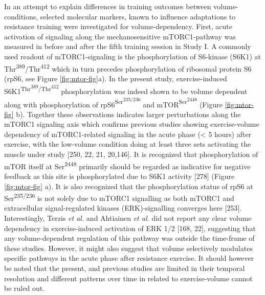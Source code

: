 \documentclass[twoside,10pt]{gihclass} %
\begin{document}
In an attempt to explain differences in training outcomes between volume-conditions, selected molecular markers, known to influence adaptations to resistance training were investigated for volume-dependency.
First, acute activation of signaling along the mechanosensitive mTORC1-pathway was measured in before and after the fifth training session in Study I.
A commonly used readout of mTORC1-signaling is the phosphorylation of S6-kinase (S6K1) at Thr\textsuperscript{389}/Thr\textsuperscript{412} which in turn precedes phosphorylation of ribosomal protein S6 (rpS6, see Figure \ref{fig:mtor-fig}a).
In the present study, exercise-induced S6K1\textsuperscript{Thr\textsuperscript{389}/Thr\textsuperscript{412}} phosphorylation was indeed shown to be volume dependent along with phosphorylation of rpS6\textsuperscript{Ser\textsuperscript{235/236}} and mTOR\textsuperscript{Ser\textsuperscript{2448}} (Figure \ref{fig:mtor-fig} b).
Together these observations indicates larger perturbations along the mTORC1 signaling axis which confirms previous studies showing exercise-volume dependency of mTORC1-related signaling in the acute phase (\textless{} 5 hours) after exercise, with the low-volume condition doing at least three sets activating the muscle under study
{[}250, 22, 21, 20,146{]}.
It is recognized that phosphorylation of mTOR itself at Ser\textsuperscript{2448} primarily should be regarded as indicative for negative feedback as this site is phosphorylated due to S6K1 activity
{[}278{]} (Figure \ref{fig:mtor-fig} a).
It is also recognized that the phosphorylation status of rpS6 at Ser\textsuperscript{235/236} is not solely due to mTORC1 signalling as both mTORC1 and extracellular signal-regulated kinases (ERK)-signalling converges here
{[}253{]}.
Interestingly, Terzis \emph{et al.} and Ahtiainen \emph{et al.} did not report any clear volume dependency in exercise-induced activation of ERK 1/2
{[}168, 22{]},
suggesting that any volume-dependent regulation of this pathway was outside the time-frame of these studies. However, it might also suggest that volume selectively modulates specific pathways in the acute phase after resistance exercise.
It should however be noted that the present, and previous studies are limited in their temporal resolution and different patterns over time in related to exercise-volume cannot be ruled out.
\end{document}
